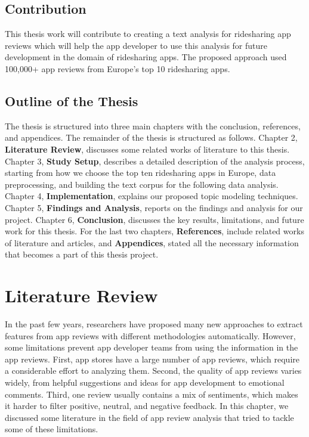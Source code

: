 \documentclass[12pt]{article}
\begin{document}
\subsection{Contribution}
This thesis work will contribute to creating a text analysis for ridesharing app reviews which will help the app developer to use this analysis for future development in the domain of ridesharing apps. The proposed approach used 100,000+ app reviews from Europe's top 10 ridesharing apps.


\subsection{Outline of the Thesis}
The thesis is structured into three main chapters with the conclusion, references, and appendices. The remainder of the thesis is structured as follows. Chapter 2, \textbf{Literature Review}, discusses some related works of literature to this thesis. Chapter 3, \textbf{Study Setup}, describes a detailed description of the analysis process, starting from how we choose the top ten ridesharing apps in Europe, data preprocessing, and building the text corpus for the following data analysis. Chapter 4, \textbf{Implementation}, explains our proposed topic modeling techniques. Chapter 5, \textbf{Findings and Analysis}, reports on the findings and analysis for our project. Chapter 6, \textbf{Conclusion}, discusses the key results, limitations, and future work for this thesis. For the last two chapters, \textbf{References}, include related works of literature and articles, and \textbf{Appendices}, stated all the necessary information that becomes a part of this thesis project.



\newpage
\section{Literature Review} 
In the past few years, researchers have proposed many new approaches to extract features from app reviews with different methodologies automatically. However, some limitations prevent app developer teams from using the information in the app reviews. First, app stores have a large number of app reviews, which require a considerable effort to analyzing them. Second, the quality of app reviews varies widely, from helpful suggestions and ideas for app development to emotional comments. Third, one review usually contains a mix of sentiments, which makes it harder to filter positive, neutral, and negative feedback. In this chapter, we discussed some literature in the field of app review analysis that tried to tackle some of these limitations.
\end{document}
